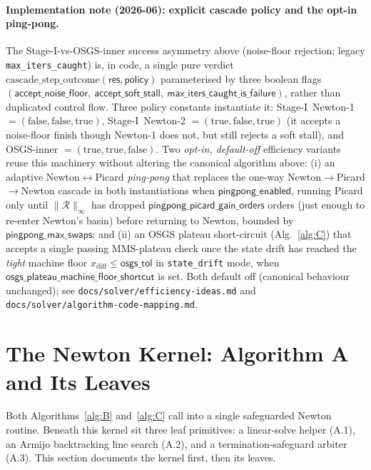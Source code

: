 \documentclass{article}
\newcommand{\code}[1]{\texttt{\small #1}}
\begin{document}
\paragraph{Implementation note (2026-06): explicit cascade policy and the opt-in ping-pong.}
The Stage-I-vs-OSGS-inner success asymmetry above (noise-floor rejection; legacy
\texttt{max\_iters\_caught}) is, in code, a single pure verdict
$\mathrm{cascade\_step\_outcome}(\mathsf{res}, \mathsf{policy})$ parameterised by
three boolean flags
$(\mathsf{accept\_noise\_floor},\ \mathsf{accept\_soft\_stall},\ \mathsf{max\_iters\_caught\_is\_failure})$,
rather than duplicated control flow. Three policy constants instantiate it:
Stage-I~Newton-1 $=(\mathrm{false},\mathrm{false},\mathrm{true})$, Stage-I~Newton-2
$=(\mathrm{true},\mathrm{false},\mathrm{true})$ (it accepts a noise-floor finish though
Newton-1 does not, but still rejects a soft stall), and OSGS-inner
$=(\mathrm{true},\mathrm{true},\mathrm{false})$. Two \emph{opt-in, default-off} efficiency
variants reuse this machinery without altering the canonical algorithm above:
(i) an adaptive Newton$\leftrightarrow$Picard \emph{ping-pong} that replaces the one-way
Newton$\to$Picard$\to$Newton cascade in both instantiations when
$\mathsf{pingpong\_enabled}$, running Picard only until $\|\mathcal{R}\|_\infty$ has dropped
$\mathsf{pingpong\_picard\_gain\_orders}$ orders (just enough to re-enter Newton's basin)
before returning to Newton, bounded by $\mathsf{pingpong\_max\_swaps}$; and (ii) an OSGS
plateau short-circuit (Alg.~\ref{alg:C}) that accepts a single passing MMS-plateau check once
the state drift has reached the \emph{tight} machine floor $x_{\mathrm{diff}}\le\mathsf{osgs\_tol}$
in \code{state\_drift} mode, when $\mathsf{osgs\_plateau\_machine\_floor\_shortcut}$ is set.
Both default off (canonical behaviour unchanged); see
\code{docs/solver/efficiency-ideas.md} and \code{docs/solver/algorithm-code-mapping.md}.

\section{The Newton Kernel: Algorithm A and Its Leaves}
\label{sec:newton}

Both Algorithms~\ref{alg:B} and~\ref{alg:C} call into a single
safeguarded Newton routine. Beneath this kernel sit three leaf
primitives: a linear-solve helper (A.1), an Armijo backtracking line
search (A.2), and a termination-safeguard arbiter (A.3). This section
documents the kernel first, then its leaves.
\end{document}
